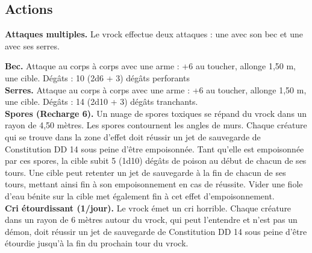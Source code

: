 \begin{figure*}[hb!]
{\begin{minipage}[c]{.45\linewidth}
    \subsection*{Actions}
    {\bfseries Attaques multiples.} Le vrock effectue deux attaques : une avec son bec et une avec ses serres.
  \end{minipage}
  \hspace{4pt}
  \begin{minipage}[c]{.45\linewidth}
    {\bfseries Bec.} Attaque au corps à corps avec une arme : +6 au toucher, allonge 1,50 m, une cible. Dégâts : 10 (2d6 + 3) dégâts perforants \\
    {\bfseries Serres.} Attaque au corps à corps avec une arme : +6 au toucher, allonge 1,50 m, une cible. Dégâts : 14 (2d10 + 3) dégâts tranchants. \\
    {\bfseries Spores (Recharge 6).} Un nuage de spores toxiques se répand du vrock dans un rayon de 4,50 mètres. Les spores contournent les angles de murs. Chaque créature qui se trouve dans la zone d'effet doit réussir un jet de sauvegarde de Constitution DD 14 sous peine d'être empoisonnée. Tant qu'elle est empoisonnée par ces spores, la cible subit 5 (1d10) dégâts de poison au début de chacun de ses tours. Une cible peut retenter un jet de sauvegarde à la fin de chacun de ses tours, mettant ainsi fin à son empoisonnement en cas de réussite. Vider une fiole d'eau bénite sur la cible met également fin à cet effet d'empoisonnement. \\
    {\bfseries Cri étourdissant (1/jour).} Le vrock émet un cri horrible. Chaque créature dans un rayon de 6 mètres autour du vrock, qui peut l'entendre et n'est pas un démon, doit réussir un jet de sauvegarde de Constitution DD 14 sous peine d'être étourdie jusqu'à la fin du prochain tour du vrock. \\
  \end{minipage}
}%
\end{figure*}


